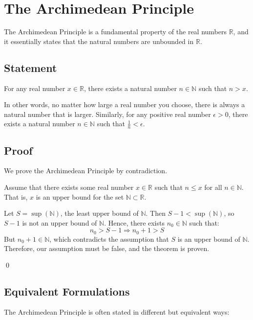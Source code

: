 \section{The Archimedean Principle}

The Archimedean Principle is a fundamental property of the real numbers \( \mathbb{R} \), and it essentially states that the natural numbers are unbounded in \( \mathbb{R} \).

\subsection{Statement}

For any real number \( x \in \mathbb{R} \), there exists a natural number \( n \in \mathbb{N} \) such that \( n > x \).


In other words, no matter how large a real number you choose, there is always a natural number that is larger. Similarly, for any positive real number \( \epsilon > 0 \), there exists a natural number \( n \in \mathbb{N} \) such that \( \frac{1}{n} < \epsilon \).

\subsection{Proof}

We prove the Archimedean Principle by contradiction.

Assume that there exists some real number \( x \in \mathbb{R} \) such that \( n \leq x \) for all \( n \in \mathbb{N} \). That is, \( x \) is an upper bound for the set \( \mathbb{N} \subset \mathbb{R} \).

Let \( S = \sup(\mathbb{N}) \), the least upper bound of \( \mathbb{N} \). Then \( S - 1 < \sup(\mathbb{N}) \), so \( S - 1 \) is not an upper bound of \( \mathbb{N} \). Hence, there exists \( n_0 \in \mathbb{N} \) such that:
\[
n_0 > S - 1 \Rightarrow n_0 + 1 > S
\]
But \( n_0 + 1 \in \mathbb{N} \), which contradicts the assumption that \( S \) is an upper bound of \( \mathbb{N} \). Therefore, our assumption must be false, and the theorem is proven.

\qed

\subsection{Equivalent Formulations}

The Archimedean Principle is often stated in different but equivalent ways:

